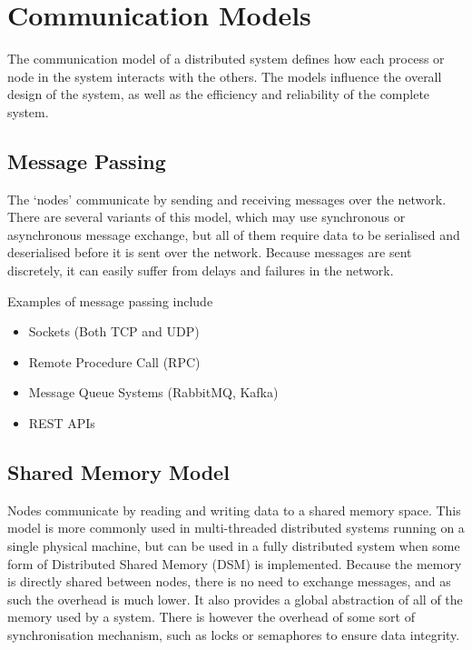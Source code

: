 
\section*{Communication Models}

The communication model of a distributed system defines how each process or node in the system interacts with the others. The models influence the overall design of the system, as well as the efficiency and reliability of the complete system.

\subsection*{Message Passing}

The `nodes' communicate by sending and receiving messages over the network. There are several variants of this model, which may use synchronous or asynchronous message exchange, but all of them require data to be serialised and deserialised before it is sent over the network. Because messages are sent discretely, it can easily suffer from delays and failures in the network.

Examples of message passing include
\begin{itemize}
  \item Sockets (Both TCP and UDP)
  \item Remote Procedure Call (RPC)
  \item Message Queue Systems (RabbitMQ, Kafka)
  \item REST APIs
\end{itemize}

\subsection*{Shared Memory Model}

Nodes communicate by reading and writing data to a shared memory space. This model is more commonly used in multi-threaded distributed systems running on a single physical machine, but can be used in a fully distributed system when some form of Distributed Shared Memory (DSM) is implemented. Because the memory is directly shared between nodes, there is no need to exchange messages, and as such the overhead is much lower. It also provides a global abstraction of all of the memory used by a system. There is however the overhead of some sort of synchronisation mechanism, such as locks or semaphores to ensure data integrity.

